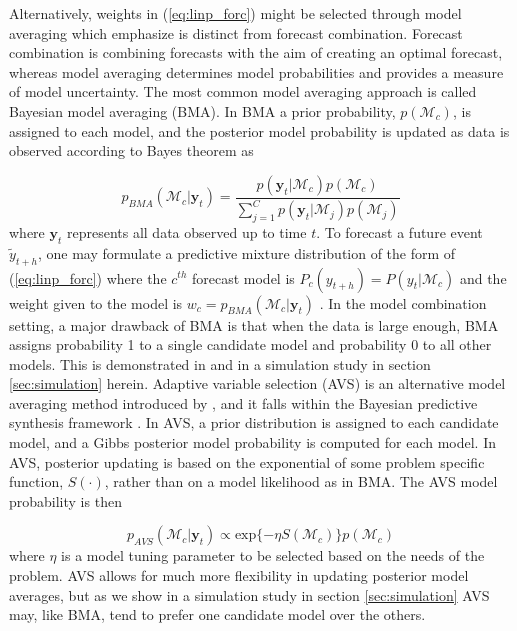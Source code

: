 Alternatively, weights in (\ref{eq:linp_forc}) might be selected through model 
averaging which \cite{wang2023forecast} emphasize is distinct from forecast 
combination. Forecast combination is combining forecasts with the aim of 
creating an optimal forecast, whereas model averaging determines model 
probabilities and provides a measure of model uncertainty. The most common 
model averaging approach is called Bayesian model averaging (BMA). In BMA a 
prior probability, $p(\mathcal{M}_c)$, is assigned to each model, and the 
posterior model probability is updated as data is observed according to Bayes 
theorem as

\begin{equation}
    \label{eq:bma}
    p_{BMA}(\mathcal{M}_c |\boldsymbol{y}_t) = 
    \frac{p(\boldsymbol{y}_t |\mathcal{M}_c)p(\mathcal{M}_c)}{\sum_{j = 1}^C 
    p(\boldsymbol{y}_t |\mathcal{M}_j)p(\mathcal{M}_j)}
\end{equation}
where $\boldsymbol{y}_t$ represents all data observed up to time $t$. 
To forecast a future event $\tilde{y}_{t+h}$, one may formulate a predictive 
mixture distribution of 
the form of (\ref{eq:linp_forc}) where the $c^{th}$ forecast model is 
$P_c(y_{t + h}) = P(y_t | \mathcal{M}_c)$ and the weight given to the model 
is $w_c = p_{BMA}(\mathcal{M}_c | \boldsymbol{y}_t)$ 
\cite[]{raftery1996hypothesis}. In the model combination setting, a major 
drawback of BMA is that when the data is large enough, BMA assigns probability 
1 to a single candidate model and probability 0 to all other models. This is 
demonstrated in \cite{yao2018using} and in a simulation study in section 
\ref{sec:simulation} herein. 
Adaptive variable selection (AVS) is an alternative model averaging method 
introduced by \cite{lavine2021adaptive}, and it falls within the Bayesian 
predictive synthesis framework \cite[]{tallman2024bayesian,mcalinn2019dynamic}. 
In AVS, a prior distribution is assigned to each candidate model, and a Gibbs 
posterior model probability is computed for each model. In AVS, 
posterior updating is based on the exponential of some problem specific 
function, $S(\cdot)$,
rather than on a model likelihood as in BMA. The AVS model probability is then

\begin{equation}
    \label{eq:avs}
    p_{AVS}(\mathcal{M}_c | \boldsymbol{y}_t) 
    \propto \text{exp}\{ -\eta S(\mathcal{M}_c)\} p(\mathcal{M}_c)
\end{equation}
where $\eta$ is a model tuning parameter to be selected based on the needs of 
the problem. AVS allows for much more flexibility in updating posterior model 
averages, but as we show in a simulation study 
in section \ref{sec:simulation} AVS 
may, like BMA, tend to prefer one candidate model over the others.

